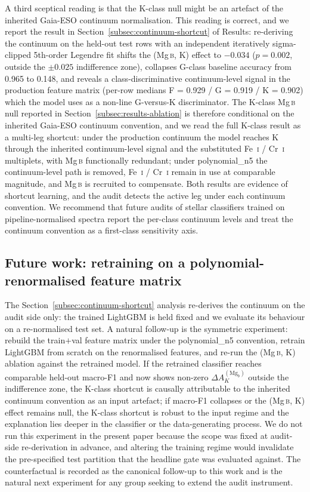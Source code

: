 \documentclass[11pt,a4paper]{article}
\newcommand{\Mgb}{Mg\,\textsc{b}\xspace}
\newcommand{\dA}{\Delta A}
\begin{document}
A third sceptical reading is that the K-class null might be an artefact of the inherited Gaia-ESO continuum normalisation. This reading is correct, and we report the result in Section~\ref{subsec:continuum-shortcut} of Results: re-deriving the continuum on the held-out test rows with an independent iteratively sigma-clipped 5th-order Legendre fit shifts the (\Mgb, K) effect to $-0.034$ ($p = 0.002$, outside the $\pm 0.025$ indifference zone), collapses G-class baseline accuracy from 0.965 to 0.148, and reveals a class-discriminative continuum-level signal in the production feature matrix (per-row medians F = 0.929 / G = 0.919 / K = 0.902) which the model uses as a non-line G-versus-K discriminator. The K-class \Mgb null reported in Section~\ref{subsec:results-ablation} is therefore conditional on the inherited Gaia-ESO continuum convention, and we read the full K-class result as a multi-leg shortcut: under the production continuum the model reaches K through the inherited continuum-level signal and the substituted Fe~\textsc{i} / Cr~\textsc{i} multiplets, with \Mgb functionally redundant; under polynomial\_n5 the continuum-level path is removed, Fe~\textsc{i} / Cr~\textsc{i} remain in use at comparable magnitude, and \Mgb is recruited to compensate. Both results are evidence of shortcut learning, and the audit detects the active leg under each continuum convention. We recommend that future audits of stellar classifiers trained on pipeline-normalised spectra report the per-class continuum levels and treat the continuum convention as a first-class sensitivity axis.

\subsection{Future work: retraining on a polynomial-renormalised feature matrix}
\label{subsec:future-counterfactual}

The Section~\ref{subsec:continuum-shortcut} analysis re-derives the continuum on the audit side only: the trained LightGBM is held fixed and we evaluate its behaviour on a re-normalised test set. A natural follow-up is the symmetric experiment: rebuild the train$+$val feature matrix under the polynomial\_n5 convention, retrain LightGBM from scratch on the renormalised features, and re-run the (\Mgb, K) ablation against the retrained model. If the retrained classifier reaches comparable held-out macro-F1 and now shows non-zero $\dA_K^{(\mathrm{Mg}_b)}$ outside the indifference zone, the K-class shortcut is causally attributable to the inherited continuum convention as an input artefact; if macro-F1 collapses or the (\Mgb, K) effect remains null, the K-class shortcut is robust to the input regime and the explanation lies deeper in the classifier or the data-generating process. We do not run this experiment in the present paper because the scope was fixed at audit-side re-derivation in advance, and altering the training regime would invalidate the pre-specified test partition that the headline gate was evaluated against. The counterfactual is recorded as the canonical follow-up to this work and is the natural next experiment for any group seeking to extend the audit instrument.
\end{document}
